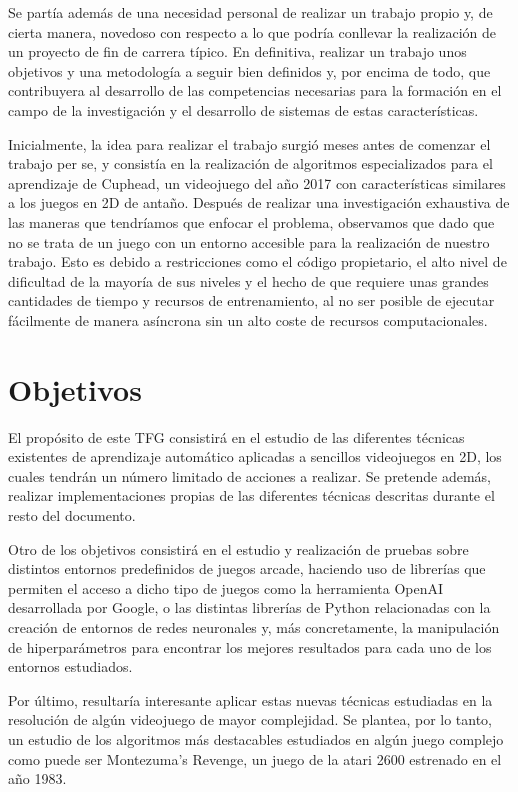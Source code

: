 \documentclass[11pt,spanish,listoffigures,listoftables]{tfgetsinf}
\begin{document}
Se partía además de una necesidad personal de realizar un trabajo propio y, de cierta manera, novedoso con respecto a lo que podría conllevar la realización de un proyecto de fin de carrera típico. En definitiva, realizar un trabajo unos objetivos y una metodología a seguir bien definidos y, por encima de todo, que contribuyera al desarrollo de las competencias necesarias para la formación en el campo de la investigación y el desarrollo de sistemas de estas características. 

Inicialmente, la idea para realizar el trabajo surgió meses antes de comenzar el trabajo per se, y consistía en la realización de algoritmos especializados para el aprendizaje de Cuphead, un videojuego del año 2017 con características similares a los juegos en 2D de antaño. Después de realizar una investigación exhaustiva de las maneras que tendríamos que enfocar el problema, observamos que dado que no se trata de un juego con un entorno accesible para la realización de nuestro trabajo. Esto es debido a restricciones como el código propietario, el alto nivel de dificultad de la mayoría de sus niveles y el hecho de que requiere unas grandes cantidades de tiempo y recursos de entrenamiento, al no ser posible de ejecutar fácilmente de manera asíncrona sin un alto coste de recursos computacionales. 

\section{Objetivos}

El propósito de este TFG consistirá en el estudio de las diferentes técnicas existentes de aprendizaje automático aplicadas a sencillos videojuegos en 2D, los cuales tendrán un número limitado de acciones a realizar. Se pretende además, realizar implementaciones propias de las diferentes técnicas descritas durante el resto del documento. \par 

Otro de los objetivos consistirá en el estudio y realización de pruebas sobre distintos entornos predefinidos de juegos arcade, haciendo uso de librerías que permiten el acceso a dicho tipo de juegos como la herramienta OpenAI desarrollada por Google, o las distintas librerías de Python relacionadas con la creación de entornos de redes neuronales y, más concretamente, la manipulación de hiperparámetros para encontrar los mejores resultados para cada uno de los entornos estudiados. \par 

Por último, resultaría interesante aplicar estas nuevas técnicas estudiadas en la resolución de algún videojuego de mayor complejidad. Se plantea, por lo tanto, un estudio de los algoritmos más destacables estudiados en algún juego complejo como puede ser Montezuma's Revenge, un juego de la atari 2600 estrenado en el año 1983.
\end{document}
